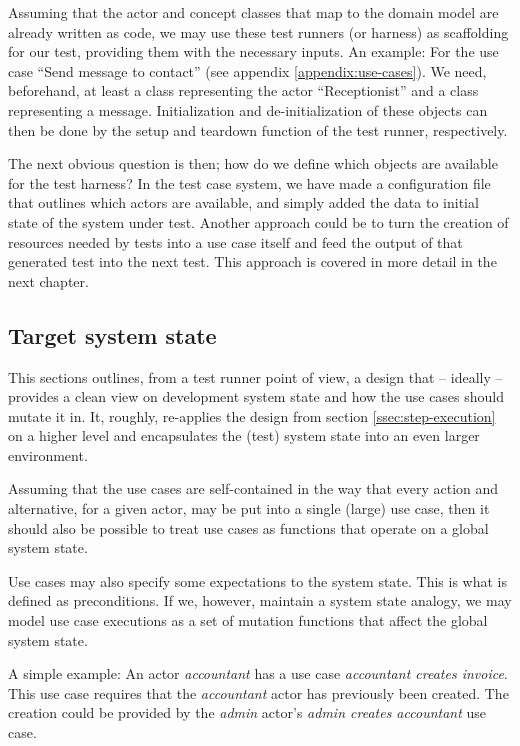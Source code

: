 \noindent Assuming that the actor and concept classes that map to the domain model are already written as code, we may use these test runners (or harness) as scaffolding for our test, providing them with the necessary inputs. An example: For the use case ``Send message to contact'' (see appendix \ref{appendix:use-cases}). We need, beforehand, at least a class representing the actor ``Receptionist'' and a class representing a message. Initialization and de-initialization of these objects can then be done by the setup and teardown function of the test runner, respectively.\medskip

\noindent The next obvious question is then; how do we define which objects are available for the test harness? In the test case system, we have made a configuration file that outlines which actors are available, and simply added the data to initial state of the system under test. Another approach could be to turn the creation of resources needed by tests into a use case itself and feed the output of that generated test into the next test. This approach is covered in more detail in the next chapter.

\subsection{Target system state}
\label{ssec:target-system-state}
This sections outlines, from a test runner point of view, a design that -- ideally -- provides a clean view on development system state and how the use cases should mutate it in. It, roughly, re-applies the design from section \ref{ssec:step-execution} on a higher level and encapsulates the (test) system state into an even larger environment.\medskip

\noindent Assuming that the use cases are self-contained\cite{larman2005} in the way that every action and alternative, for a given actor, may be put into a single (large) use case, then it should also be possible to treat use cases as functions that operate on a global system state.\medskip

\noindent Use cases may also specify some expectations to the system state. This is what is defined as preconditions. If we, however, maintain a system state analogy, we may model use case executions as a set of mutation functions that affect the global system state.\medskip

\noindent A simple example: An actor \emph{accountant} has a use case \emph{accountant creates invoice}. This use case requires that the \emph{accountant} actor has previously been created. The creation could be provided by the \emph{admin} actor's \emph{admin creates accountant} use case.\medskip


